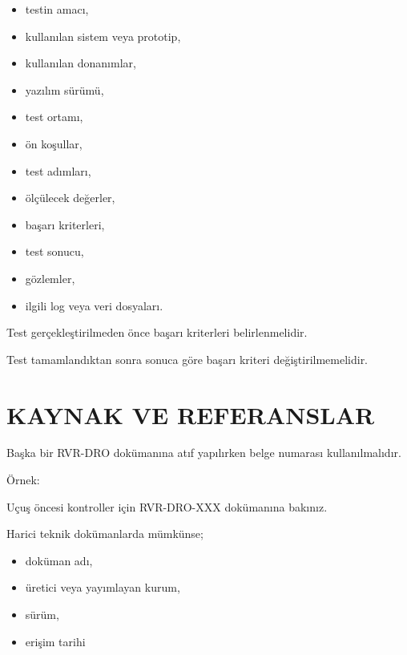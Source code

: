 \documentclass[11pt,a4paper]{article}
\begin{document}
\begin{itemize}
    \item testin amacı,
    \item kullanılan sistem veya prototip,
    \item kullanılan donanımlar,
    \item yazılım sürümü,
    \item test ortamı,
    \item ön koşullar,
    \item test adımları,
    \item ölçülecek değerler,
    \item başarı kriterleri,
    \item test sonucu,
    \item gözlemler,
    \item ilgili log veya veri dosyaları.
\end{itemize}

Test gerçekleştirilmeden önce başarı kriterleri belirlenmelidir.

\begin{dikkatkutusu}
Test tamamlandıktan sonra sonuca göre başarı kriteri değiştirilmemelidir.
\end{dikkatkutusu}


\newpage

\section{KAYNAK VE REFERANSLAR}

Başka bir RVR-DRO dokümanına atıf yapılırken belge numarası kullanılmalıdır.

Örnek:

\begin{ornek}
Uçuş öncesi kontroller için RVR-DRO-XXX dokümanına bakınız.
\end{ornek}

Harici teknik dokümanlarda mümkünse;

\begin{itemize}
    \item doküman adı,
    \item üretici veya yayımlayan kurum,
    \item sürüm,
    \item erişim tarihi
\end{itemize}
\end{document}
